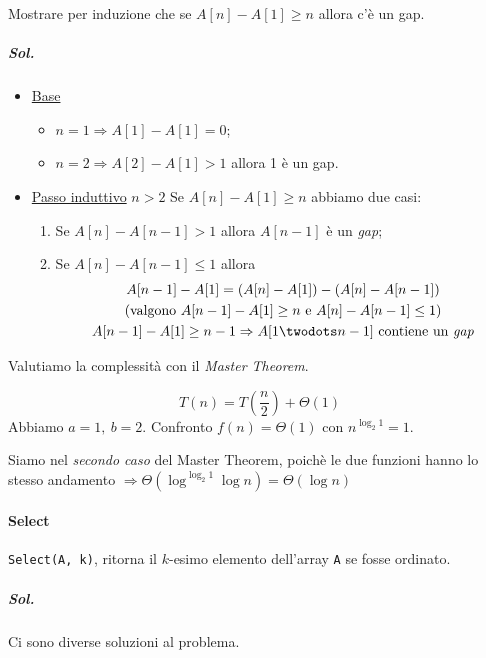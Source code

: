 Mostrare per induzione che se $A[n] - A[1] \geq n$ allora c'è un gap.

\subparagraph{Sol.}
\begin{itemize}
	\item \underline{Base}
	\begin{itemize}
		\item $n = 1 \Rightarrow A[1] - A[1] = 0$;
		\item $n = 2 \Rightarrow A[2] - A[1] > 1$ allora 1 è un gap.
	\end{itemize}
	\item \underline{Passo induttivo} $n > 2$
		Se $A[n] - A[1] \geq n$ abbiamo due casi:
		\begin{enumerate}
			\item Se $A[n] - A[n-1] > 1$ allora $A[n-1]$ è un \emph{gap};
			\item Se $A[n] - A[n-1] \leq 1$ allora
			\begin{gather*}
				A[n-1] - A[1] = \left( A[n] - A[1] \right) - \left( A[n] - A[n-1] \right) \\
				(\text{valgono } A[n-1]-A[1] \geq n \text{ e } A[n]-A[n-1] \leq 1) \\
				A[n-1] - A[1] \geq n-1 \Rightarrow A[1\twodots n-1] \text{ contiene un \emph{gap}}
			\end{gather*}
		\end{enumerate}
\end{itemize}



Valutiamo la complessità con il \emph{Master Theorem}.

$$T(n) = T\left( \frac{n}{2} \right) + \Theta(1)$$
Abbiamo $a = 1, \ b = 2$. Confronto $f(n) = \Theta(1)$ con $n^{\log_2 1} = 1$.\par
Siamo nel \emph{secondo caso} del Master Theorem, poichè le due funzioni hanno lo stesso
andamento $\Rightarrow \Theta (\log^{\log_2 1} \log n) = \Theta(\log n)$

\paragraph{Select} \texttt{Select(A, k)}, ritorna il $k$-esimo elemento 
dell'array \texttt{A} se fosse ordinato.

\subparagraph{Sol.} Ci sono diverse soluzioni al problema.

